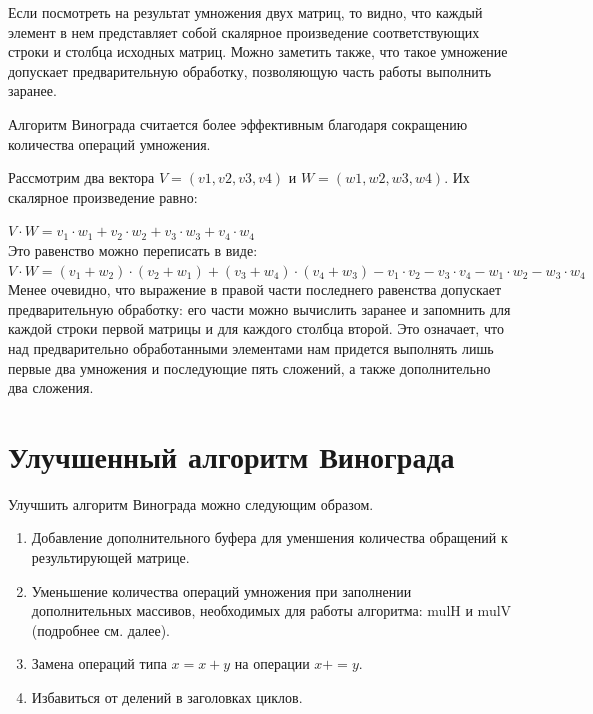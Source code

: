 \documentclass[a4paper,14pt]{report}
\begin{document}
Если посмотреть на результат умножения двух матриц, то видно, что каждый элемент в нем представляет собой скалярное произведение соответствующих строки и столбца исходных матриц. Можно заметить также, что такое умножение допускает предварительную обработку, позволяющую часть работы выполнить заранее.

Алгоритм Винограда считается более эффективным благодаря сокращению количества операций умножения.

Рассмотрим два вектора $V = (v1, v2, v3, v4)$ и $W = (w1, w2, w3, w4)$. Их скалярное произведение равно:

$ V \cdot W=v_1 \cdot w_1 + v_2 \cdot w_2 + v_3 \cdot w_3 + v_4 \cdot w_4$ \\

Это равенство можно переписать в виде: \\
$V \cdot W=(v_1 + w_2) \cdot (v_2 + w_1) + (v_3 + w_4) \cdot (v_4 + w_3) - v_1 \cdot v_2 - v_3 \cdot v_4 - w_1 \cdot w_2 - w_3 \cdot w_4$\\

Менее очевидно, что выражение в правой части последнего равенства допускает предварительную обработку: его части можно вычислить заранее и запомнить для каждой строки первой матрицы и для каждого столбца второй.
Это означает, что над предварительно обработанными элементами нам придется выполнять лишь первые два умножения и последующие пять сложений, а также дополнительно два сложения.

\section*{Улучшенный алгоритм Винограда}

Улучшить алгоритм Винограда можно следующим образом.

\begin{enumerate}
	\item Добавление дополнительного буфера для уменшения количества обращений к результирующей матрице.
	\item Уменьшение количества операций умножения при заполнении дополнительных массивов, необходимых для работы алгоритма: mulH и mulV (подробнее см. далее).
	\item Замена операций типа $x = x + y$ на операции $x += y$.
	\item Избавиться от делений в заголовках циклов.
\end{enumerate}
\end{document}
